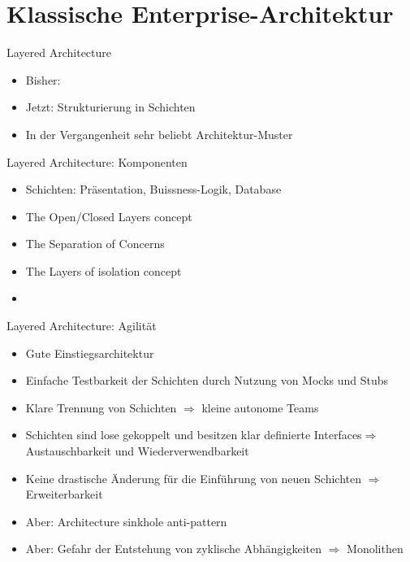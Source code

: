 \section{Klassische Enterprise-Architektur}


\begin{frame}{Layered Architecture}
    \begin{itemize}
        \item Bisher:
        \item Jetzt: Strukturierung in Schichten
        \item In der Vergangenheit sehr beliebt Architektur-Muster
    \end{itemize}
\end{frame}

\begin{frame}{Layered Architecture: Komponenten}
    \begin{itemize}
        \item Schichten: Präsentation, Buissness-Logik, Database
        \item The Open/Closed Layers concept
        \item The Separation of Concerns
        \item The Layers of isolation concept
        \item
    \end{itemize}
\end{frame}

\begin{frame}{Layered Architecture: Agilität}
    \begin{itemize}
        \item Gute Einstiegsarchitektur
        \item Einfache Testbarkeit der Schichten durch Nutzung von Mocks und Stubs
        \item Klare Trennung von Schichten $\Rightarrow$ kleine autonome Teams
        \item Schichten sind lose gekoppelt und besitzen klar definierte Interfaces$\Rightarrow$ Austauschbarkeit und Wiederverwendbarkeit
        \item Keine drastische Änderung für die Einführung von neuen Schichten $\Rightarrow$ Erweiterbarkeit
        \item Aber: Architecture sinkhole anti-pattern
        \item Aber: Gefahr der Entstehung von zyklische Abhängigkeiten $\Rightarrow$ Monolithen
    \end{itemize}
\end{frame}